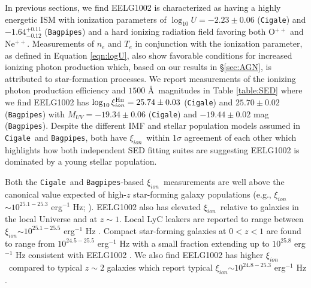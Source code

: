 \documentclass[twocolumn,tight,times,linenumbers]{aastex631}
\newcommand{\xiion}{$\xi_{ion}$}
\newcommand{\xiionHtwo}{$\xi_{ion}^\textrm{H{\sc ii}}$}
\newcommand{\cigale}{\texttt{Cigale}}
\newcommand{\bagpipes}{\texttt{Bagpipes}}
\begin{document}
		
		In previous sections, we find EELG1002 is characterized as having a highly energetic ISM with ionization parameters of $\log_{10} U = -2.23\pm0.06$ (\cigale) and $-1.64^{+0.11}_{-0.12}$ (\bagpipes) and a hard ionizing radiation field favoring both O$^{++}$ and Ne$^{++}$. Measurements of $n_e$ and $T_e$ in conjunction with the ionization parameter, as defined in Equation \ref{eqn:logU}, also show favorable conditions for increased ionizing photon production which, based on our results in \S\ref{sec:AGN}, is attributed to star-formation processes. We report measurements of the ionizing photon production efficiency and $1500$ \AA~magnitudes in Table \ref{table:SED} where we find EELG1002 has $\log_{10}\textrm{\xiionHtwo} = 25.74\pm0.03$ (\cigale) and $25.70\pm0.02$ (\bagpipes) with $M_{UV} = -19.34\pm0.06$ (\cigale) and $-19.44\pm0.02$ mag (\bagpipes). Despite the different IMF and stellar population models assumed in \cigale~and \bagpipes, both have \xiion~within $1\sigma$ agreement of each other which highlights how both independent SED fitting suites are suggesting EELG1002 is dominated by a young stellar population.
	
		Both the \cigale~and \bagpipes-based \xiion~measurements are well above the canonical value expected of high-$z$ star-forming galaxy populations (e.g., \xiion~$\sim 10^{25.1 - 25.3}$ erg$^{-1}$ Hz; \citealt{Robertson2013}). EELG1002 also has elevated \xiion~relative to galaxies in the local Universe and at $z \sim 1$. Local LyC leakers are reported to range between \xiion$ \sim 10^{25.1 - 25.5}$ erg$^{-1}$ Hz \citep{Schaerer2016}. Compact star-forming galaxies at $0 < z < 1$ are found to range from $10^{24.5 - 25.5}$ erg$^{-1}$ Hz with a small fraction extending up to $10^{25.8}$ erg$^{-1}$ Hz consistent with EELG1002 \citep{Izotov2017}. We also find EELG1002 has higher \xiion~compared to typical $z \sim 2$ galaxies which report typical \xiion $\sim 10^{24.8 - 25.3}$ erg$^{-1}$ Hz \citep{Matthee2017,Shivaei2018}.
		
\end{document}
